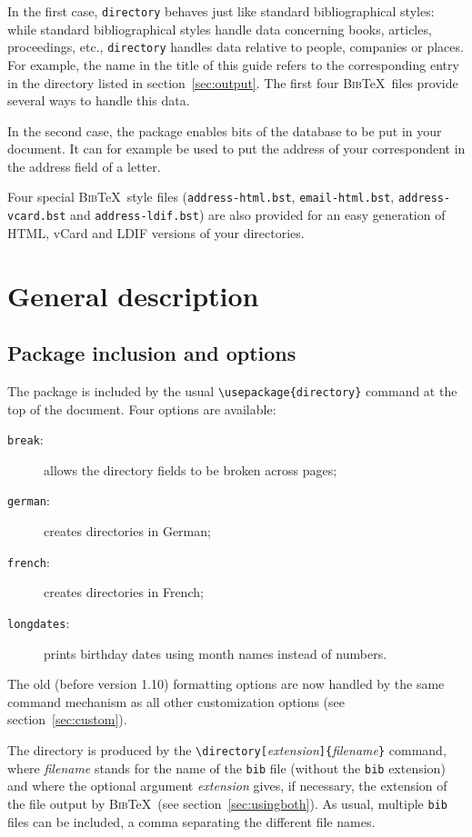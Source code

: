 \documentclass[10pt]{article}
\newcommand{\BibTeX}{\textsc{Bib}\TeX}
\begin{document}
In the first case, \texttt{directory} behaves just like standard
bibliographical styles: while standard bibliographical styles handle data
concerning books, articles, proceedings, etc., \texttt{directory} handles
data relative to people, companies or places. For example, the name in the
title of this guide refers to the corresponding entry in the directory
listed in section~\ref{sec:output}. The first four \BibTeX\ files provide
several ways to handle this data.

In the second case, the package enables bits of the database to be put in your
document. It can for example be used to put the address of your correspondent
in the address field of a letter.  

\sloppypar
Four special \BibTeX\ style files (\texttt{address-html.bst},
\texttt{email-html.bst}, \texttt{address-vcard.bst} and
\texttt{address-ldif.bst}) are also provided for an easy generation of HTML,
vCard and LDIF versions of your directories.

\section{General description}

\subsection{Package inclusion and options}

The package is included by the usual \verb'\usepackage{directory}' command
at the top of the document. Four options are available:
\begin{description}
\item[\textmd{\texttt{break}:}] allows the directory fields to be broken
  across pages;
\item[\textmd{\texttt{german}:}] creates directories in German;
\item[\textmd{\texttt{french}:}] creates directories in French;
\item[\textmd{\texttt{longdates}:}] prints birthday dates using month names
  instead of numbers.
\end{description}
The old (before version 1.10) formatting options are now handled by the same
command mechanism as all other customization options (see
section~\ref{sec:custom}).

The directory is produced by the
\verb'\directory['\emph{extension}\verb']{'\emph{filename}\verb'}' command,
where \emph{filename} stands for the name of the \texttt{bib} file (without
the \texttt{bib} extension) and where the optional argument \emph{extension}
gives, if necessary, the extension of the file output by \BibTeX\ (see
section~\ref{sec:usingboth}). As usual, multiple \texttt{bib} files can be
included, a comma separating the different file names.
\end{document}
